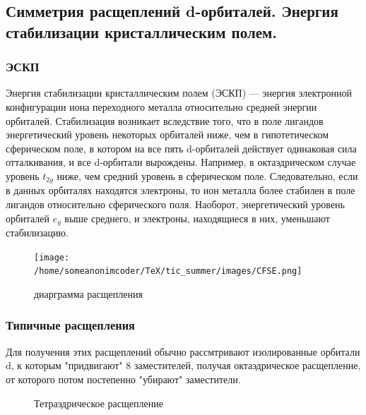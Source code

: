 
\subsection{Симметрия расщеплений d-орбиталей. Энергия стабилизации кристаллическим полем.}

\subsubsection*{ЭСКП}

Энергия стабилизации кристаллическим полем (ЭСКП) — энергия электронной конфигурации иона переходного металла относительно средней энергии орбиталей. Стабилизация возникает вследствие того, что в поле лигандов энергетический уровень некоторых орбиталей ниже, чем в гипотетическом сферическом поле, в котором на все пять d-орбиталей действует одинаковая сила отталкивания, и все d-орбитали вырождены. Например, в октаэдрическом случае уровень $t_{2g}$ ниже, чем средний уровень в сферическом поле. Следовательно, если в данных орбиталях находятся электроны, то ион металла более стабилен в поле лигандов относительно сферического поля. Наоборот, энергетический уровень орбиталей $e_g$ выше среднего, и электроны, находящиеся в них, уменьшают стабилизацию.


\begin{figure}[H]
\centering
\texttt{[image: /home/someanonimcoder/TeX/tic\_summer/images/CFSE.png]}
\caption{диарграмма расщепления}
\label{}
\end{figure}

\subsubsection*{Типичные расщепления}

Для получения этих расщеплений обычно рассмтривают изолированные орбитали d, к которым "придвигают" 8 заместителей, получая октаэдрическое расщепление, от которого потом постепенно "убирают" заместители.

\begin{figure}[H]%
    \centering
    \qquad
    \label{fig:example}%
        \caption{Тетраэдрическое расщепление}
\end{figure}



